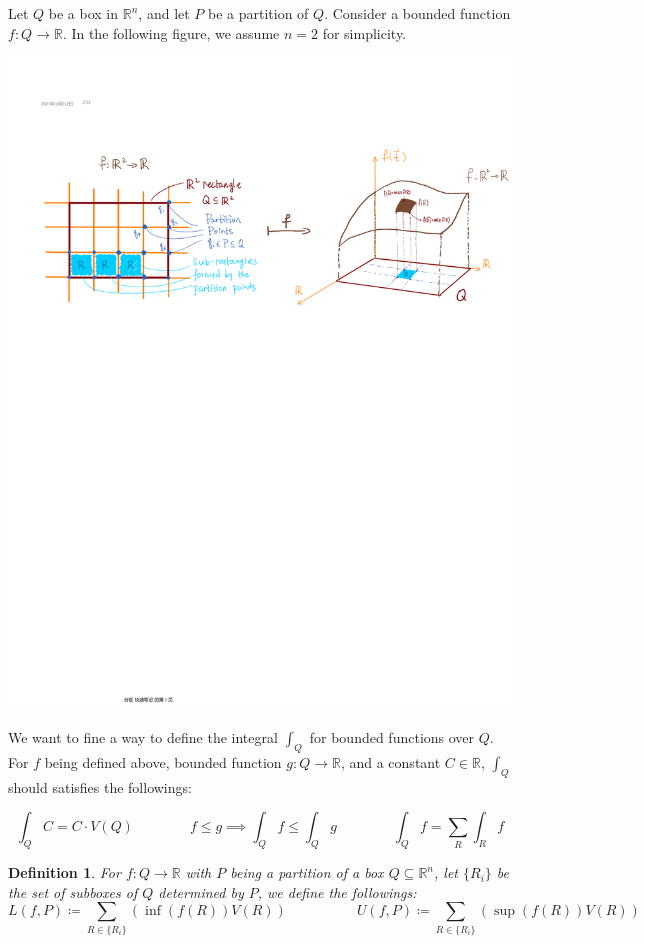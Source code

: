 \documentclass[15pt]{book}
\theoremstyle{break}
\theoremstyle{break}
\newtheorem{defn}{Definition}[corL]
\newcommand{\R}{\mathbb{R}}
\begin{document}
Let $Q$ be a box in $\R^n$, and let $P$ be a partition of $Q$. Consider a bounded function $f:Q \to \R$. In the following figure, we assume $n=2$ for simplicity. 
\begin{center}
\includegraphics[scale=0.73]{integration.pdf}
\end{center}
We want to fine a way to define the integral $\int_Q$ for bounded functions over $Q$. For $f$ being defined above, bounded function $g:Q \to \R$, and a constant $C \in \R$, $\int_Q$ should satisfies the followings: 

$$\int_Q C = C \cdot V(Q) \qquad\qquad f\leq g \implies \int_Q f \leq \int_Q g \qquad\qquad \int_Q f = \sum_R \int_R f$$

\begin{defn}
For $f:Q \to \R$ with $P$ being a partition of a box $Q\subseteq \R^n$, let $\{R_i\}$ be the set of subboxes of $Q$ determined by $P$, we define the followings:
$$L(f,P) \coloneqq \sum_{R\in \{R_i\}} \left(\inf(f(R))V(R)\right) \qquad\qquad\quad	U(f,P) \coloneqq \sum_{R\in \{R_i\}} \left(\sup(f(R))V(R)\right)$$
\end{defn}
\end{document}
